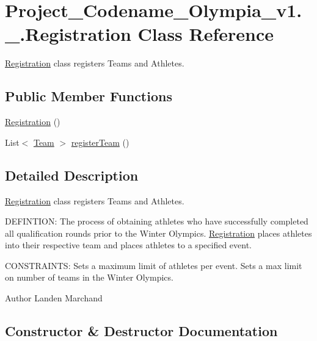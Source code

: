 \hypertarget{classProject__Codename__Olympia__v1_1_1__0_1_1Registration}{}\section{Project\+\_\+\+Codename\+\_\+\+Olympia\+\_\+v1.\+\_.\+Registration Class Reference}
\label{classProject__Codename__Olympia__v1_1_1__0_1_1Registration}


\hyperlink{classProject__Codename__Olympia__v1_1_1__0_1_1Registration}{Registration} class registers Teams and Athletes.  


\subsection*{Public Member Functions}
\begin{DoxyCompactItemize}
\item 
\hyperlink{classProject__Codename__Olympia__v1_1_1__0_1_1Registration_a1c89ef8d19a30a89a298d540f576f146}{Registration} ()
\item 
List$<$ \hyperlink{classProject__Codename__Olympia__v1_1_1__0_1_1Team}{Team} $>$ \hyperlink{classProject__Codename__Olympia__v1_1_1__0_1_1Registration_a44b2f6bdcf9dbd46d155af0c8bafa2ae}{register\+Team} ()
\end{DoxyCompactItemize}


\subsection{Detailed Description}
\hyperlink{classProject__Codename__Olympia__v1_1_1__0_1_1Registration}{Registration} class registers Teams and Athletes. 

D\+E\+F\+I\+N\+T\+I\+ON\+: The process of obtaining athletes who have successfully completed all qualification rounds prior to the Winter Olympics. \hyperlink{classProject__Codename__Olympia__v1_1_1__0_1_1Registration}{Registration} places athletes into their respective team and places athletes to a specified event.

C\+O\+N\+S\+T\+R\+A\+I\+N\+TS\+: Sets a maximum limit of athletes per event. Sets a max limit on number of teams in the Winter Olympics.\begin{DoxyAuthor}{Author}
Landen Marchand 
\end{DoxyAuthor}


\subsection{Constructor \& Destructor Documentation}
\mbox{\label{classProject__Codename__Olympia__v1_1_1__0_1_1Registration_a1c89ef8d19a30a89a298d540f576f146}} 

